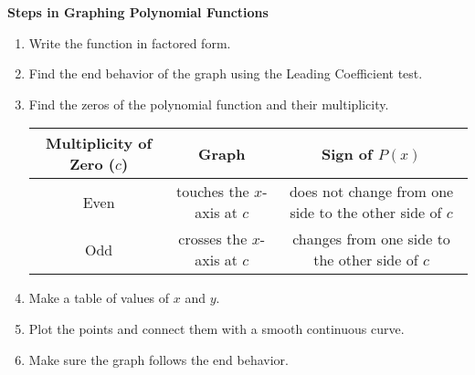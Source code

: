 \textbf{Steps in Graphing Polynomial Functions} 
\begin{enumerate}[label = \arabic*. ]
\item \hspce Write the function in factored form. 
\item \hspce Find the end behavior of the graph using the Leading Coefficient test. 
\item \hspce Find the zeros of the polynomial function and their multiplicity. \\
\begin{center}

\noindent\begin{minipage}{\textwidth}
\begin{tabularx}{\textwidth}{CCC}
  
\toprule
\textbf{Multiplicity of Zero ($c$)} & \textbf{Graph}  & \textbf{Sign of $P(x)$ }\\
\midrule
Even & touches the $x$-axis at $c$ & does not change from one side to the other side of $c$\\
 \midrule
Odd & crosses the $x$-axis at $c$ & changes from one side to the other side of $c$\\
\bottomrule
\end{tabularx} 
\end{minipage}
\end{center} 
  
\item \hspce Make a table of values of $x$ and $y$. 
\item \hspce Plot the points and connect them with a smooth continuous curve. 
\item \hspce Make sure the graph follows the end behavior. 
\end{enumerate}  
